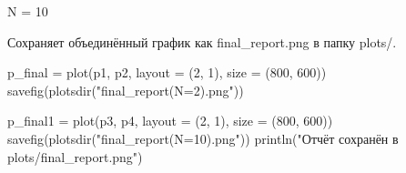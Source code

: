 \documentclass[
  12pt,
  a4paper,
  DIV=11,
  numbers=noendperiod]{scrreprt}
\newenvironment{Shaded}{\begin{snugshade}}{\end{snugshade}}
\newcommand{\FloatTok}[1]{\textcolor[rgb]{0.68,0.00,0.00}{#1}}
\newcommand{\FunctionTok}[1]{\textcolor[rgb]{0.28,0.35,0.67}{#1}}
\newcommand{\NormalTok}[1]{\textcolor[rgb]{0.00,0.23,0.31}{#1}}
\newcommand{\OperatorTok}[1]{\textcolor[rgb]{0.37,0.37,0.37}{#1}}
\newcommand{\SpecialCharTok}[1]{\textcolor[rgb]{0.37,0.37,0.37}{#1}}
\newcommand{\StringTok}[1]{\textcolor[rgb]{0.13,0.47,0.30}{#1}}
\begin{document}


N = 10

\begin{Shaded}
\end{Shaded}



Сохраняет объединённый график как final\_report.png в папку plots/.

\begin{Shaded}
\begin{Highlighting}[]
\NormalTok{p\_final }\OperatorTok{=} \FunctionTok{plot}\NormalTok{(p1, p2, layout }\OperatorTok{=}\NormalTok{ (}\FloatTok{2}\NormalTok{, }\FloatTok{1}\NormalTok{), size }\OperatorTok{=}\NormalTok{ (}\FloatTok{800}\NormalTok{, }\FloatTok{600}\NormalTok{))}
\FunctionTok{savefig}\NormalTok{(}\FunctionTok{plotsdir}\NormalTok{(}\StringTok{"final\_report(N=2).png"}\NormalTok{))}

\NormalTok{p\_final1 }\OperatorTok{=} \FunctionTok{plot}\NormalTok{(p3, p4, layout }\OperatorTok{=}\NormalTok{ (}\FloatTok{2}\NormalTok{, }\FloatTok{1}\NormalTok{), size }\OperatorTok{=}\NormalTok{ (}\FloatTok{800}\NormalTok{, }\FloatTok{600}\NormalTok{))}
\FunctionTok{savefig}\NormalTok{(}\FunctionTok{plotsdir}\NormalTok{(}\StringTok{"final\_report(N=10).png"}\NormalTok{))}
\FunctionTok{println}\NormalTok{(}\StringTok{"Отчёт сохранён в plots/final\_report.png"}\NormalTok{)}
\end{Highlighting}
\end{Shaded}
\end{document}
